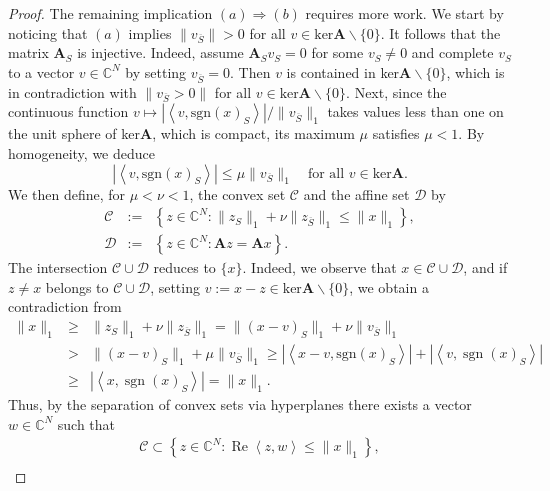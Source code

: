 \begin{proof}
    The remaining implication $(a) \Rightarrow (b)$ requires more work. We start by noticing that $(a)$ implies $\|v_{\overline{S}}\| > 0$ for all $v \in \text{ker}\mathbf{A} \backslash \{0\}$. It follows that the matrix $\mathbf{A}_S$ is injective. Indeed, assume $\mathbf{A}_S v_S = 0$ for some $v_S \neq 0$ and complete $v_S$ to a vector $v \in \mathbb{C}^N$ by setting $v_{\overline{S}} = 0$. Then $v$ is contained in ker$\mathbf{A} \backslash \{0\}$, which is in contradiction with $\|v_{\overline{S}} > 0\|$ for all $v \in \text{ker}\mathbf{A}\backslash \{0\}$. Next, since the continuous function $v \mapsto\left|\left<v, \text{sgn}(x)_S\right>\right|/\|v_{\overline{S}}\|_1$ takes values less than one on the unit sphere of ker$\mathbf{A}$, which is compact, its maximum $\mu$ satisfies $\mu<1$. By homogeneity, we deduce
    \[
        \left|\left<v, \text{sgn}(x)_S\right>\right| \leq \mu \|v_{\overline{S}}\|_1 \quad \text{for all } v \in \text{ker}\mathbf{A}.
    \]
    We then define, for $\mu<\nu<1$, the convex set $\mathcal{C}$ and the affine set $\mathcal{D}$ by
    \begin{eqnarray*}
        \mathcal{C} &:=& \left\{ z \in \mathbb{C}^N : \|z_S\|_1 + \nu \|z_{\overline{S}}\|_1 \leq \|x\|_1 \right\}, \\
        \mathcal{D} &:=& \left\{ z \in \mathbb{C}^N : \mathbf{A}z = \mathbf{A}x \right\}.
    \end{eqnarray*}
    The intersection $\mathcal{C} \cup \mathcal{D}$ reduces to $\{x\}$. Indeed, we observe that $x \in \mathcal{C} \cup \mathcal{D}$, and if $z \neq x$ belongs to $\mathcal{C}\cup \mathcal{D}$, setting $v := x-z \in \text{ker}\mathbf{A} \backslash \{0\}$, we obtain a contradiction from 
    \begin{eqnarray*}
        \|x\|_1 &\geq& \|z_S\|_1 + \nu\|z_{\overline{S}}\|_1 = \|(x-v)_S\|_1 + \nu\|v_{\overline{S}}\|_1 \\
        &>& \|(x-v)_S\|_1 + \mu\|v_{\overline{S}}\|_1 \geq \left|\left<x-v, \text{sgn}(x)_S\right>\right| + \left|\left<v, \mathop{\mathrm{sgn}}(x)_S\right>\right| \\
        &\geq& \left|\left<x, \mathop{\mathrm{sgn}}(x)_S\right>\right| = \|x\|_1.
    \end{eqnarray*}
    Thus, by the separation of convex sets via hyperplanes there exists a vector $w \in \mathbb{C}^N$ such that
    \begin{eqnarray}
        \label{eq0.4.22}
        \mathcal{C} \subset \left\{ z \in \mathbb{C}^N : \mathop{\mathrm{Re}}\left<z,w\right> \leq \|x\|_1 \right\}, \\

\end{eqnarray}
\end{proof}
